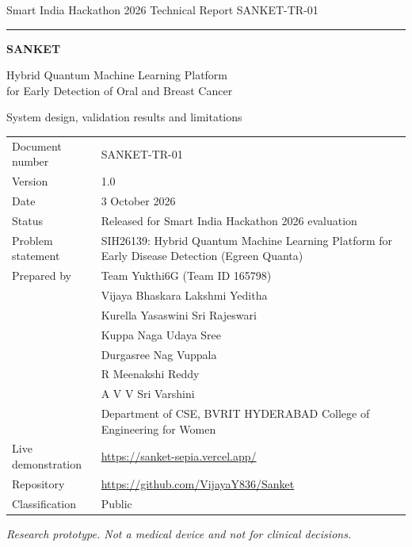 \documentclass[11pt,a4paper]{article}
\newcommand{\docno}{SANKET-TR-01}
\newcommand{\version}{1.0}
\newcommand{\docdate}{3 October 2026}
\begin{document}
\begin{titlepage}
\thispagestyle{empty}
\sffamily
{\small Smart India Hackathon 2026 \hfill Technical Report \docno}\par
\vspace{2pt}\rule{\textwidth}{0.6pt}\par
\vspace{3.2cm}
{\color{accent}\fontsize{30}{36}\selectfont\bfseries SANKET}\par
\vspace{10pt}
{\LARGE Hybrid Quantum Machine Learning Platform\\[4pt] for Early Detection of Oral and Breast Cancer}\par
\vspace{14pt}
{\large System design, validation results and limitations}\par
\vspace{2.6cm}
\rmfamily
\begin{tabular}{@{}p{4.2cm}p{10.4cm}@{}}
\toprule
Document number & \docno \\
Version & \version \\
Date & \docdate \\
Status & Released for Smart India Hackathon 2026 evaluation \\
Problem statement & SIH26139: Hybrid Quantum Machine Learning Platform for Early Disease Detection (Egreen Quanta) \\
Prepared by & Team Yukthi6G (Team ID 165798)\\
 & Vijaya Bhaskara Lakshmi Yeditha \\
 & Kurella Yasaswini Sri Rajeswari \\
 & Kuppa Naga Udaya Sree \\
 & Durgasree Nag Vuppala \\
 & R Meenakshi Reddy \\
 & A V V Sri Varshini \\
 & Department of CSE, BVRIT HYDERABAD College of Engineering for Women \\
Live demonstration & \url{https://sanket-sepia.vercel.app/} \\
Repository & \url{https://github.com/VijayaY836/Sanket} \\
Classification & Public \\
\bottomrule
\end{tabular}
\vfill
{\small\itshape Research prototype. Not a medical device and not for clinical decisions.\par}
\end{titlepage}
\end{document}
